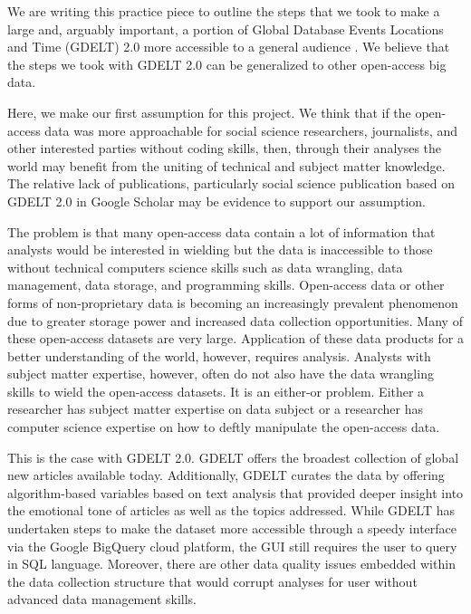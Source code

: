 \documentclass[preprint,authoryear,12pt]{elsarticle/elsarticle}
\begin{document}
We are writing this practice piece to outline the steps that we took to make a large and, arguably important, a portion of Global Database Events Locations and Time (GDELT) 2.0 more accessible to a general audience \citep{GDELT2015, GDELT2020}. We believe that the steps we took with GDELT 2.0 can be generalized to other open-access big data. 

Here, we make our first assumption for this project. We think that if the open-access data was more approachable for social science researchers, journalists, and other interested parties without coding skills, then, through their analyses the world may benefit from the uniting of technical and subject matter knowledge. The relative lack of publications, particularly social science publication based on GDELT 2.0 in Google Scholar may be evidence to support our assumption. 

The problem is that many open-access data contain a lot of information that analysts would be interested in wielding but the data is inaccessible to those without technical computers science skills such as data wrangling, data management, data storage, and programming skills. Open-access data or other forms of non-proprietary data is becoming an increasingly prevalent phenomenon due to greater storage power and increased data collection opportunities. Many of these open-access datasets are very large. Application of these data products for a better understanding of the world, however, requires analysis. Analysts with subject matter expertise, however, often do not also have the data wrangling skills to wield the open-access datasets. It is an either-or problem. Either a researcher has subject matter expertise on data subject or a researcher has computer science expertise on how to deftly manipulate the open-access data.

This is the case with GDELT 2.0. GDELT offers the broadest collection of global new articles available today. Additionally, GDELT curates the data by offering algorithm-based variables based on text analysis that provided deeper insight into the emotional tone of articles as well as the topics addressed. While GDELT has undertaken steps to make the dataset more accessible through a speedy interface via the Google BigQuery cloud platform, the GUI still requires the user to query in SQL language. Moreover, there are other data quality issues embedded within the data collection structure that would corrupt analyses for user without advanced data management skills. 
\end{document}
